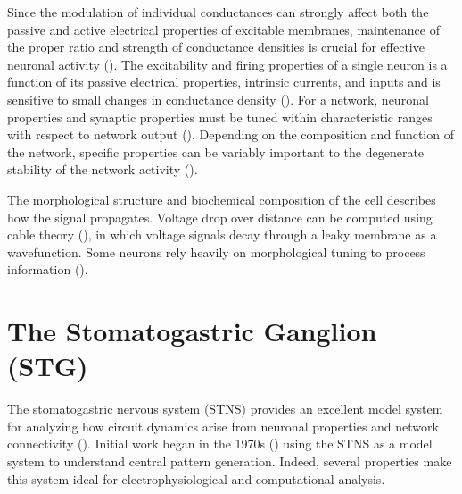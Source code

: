 \documentclass[14pt]{article}
\begin{document}
	Since the modulation of individual conductances can strongly affect both the passive and active electrical properties of excitable membranes, maintenance of the proper ratio and strength of conductance densities is crucial for effective neuronal activity (\cite{GjorgjievaIntrinsicNeuronalProperties2014,GjorgjievaComputationalimplicationsbiophysical2016}). The excitability and firing properties of a single neuron is a function of its passive electrical properties, intrinsic currents, and inputs and is sensitive to small changes in conductance density (\cite{KaczmarekNeuromodulationBiochemicalControl1987,RinzelFormalClassificationBursting1987,GolowaschCharacterizationstomatogastricganglion1991,GuckenheimerMappingDynamicsBursting1993}). For a network, neuronal properties and synaptic properties must be tuned within characteristic ranges with respect to network output (\cite{MarderCentralpatterngenerators2001a,PrinzComputationalapproachesneuronal2010,DrionIonchanneldegeneracy2015}). Depending on the composition and function of the network, specific properties can be variably important to the degenerate stability of the network activity (\cite{EdelmanDegeneracycomplexitybiological2001,TononiMeasuresdegeneracyredundancy1999}).
	
	The morphological structure and biochemical composition of the cell describes how the signal propagates. Voltage drop over distance can be computed using cable theory (\cite{NormanCableTheoryFinite1972}), in which voltage signals decay through a leaky membrane as a wavefunction. Some neurons rely heavily on morphological tuning to process information (\cite{MainenInfluencedendriticstructure1996,StiefelMappingfunctionneuronal2007,CuntzOnerulegrow2010}).
	
	\section{The Stomatogastric Ganglion (STG)}
	The stomatogastric nervous system (STNS) provides an excellent model system for analyzing how circuit dynamics arise from neuronal properties and network connectivity (\cite{SelverstonCrustaceanStomatogastricSystem1987}). Initial work began in the 1970s (\cite{MaynardSimplernetworks1972}) using the STNS as a model system to understand central pattern generation. Indeed, several properties make this system ideal for electrophysiological and computational analysis.
	
\end{document}

